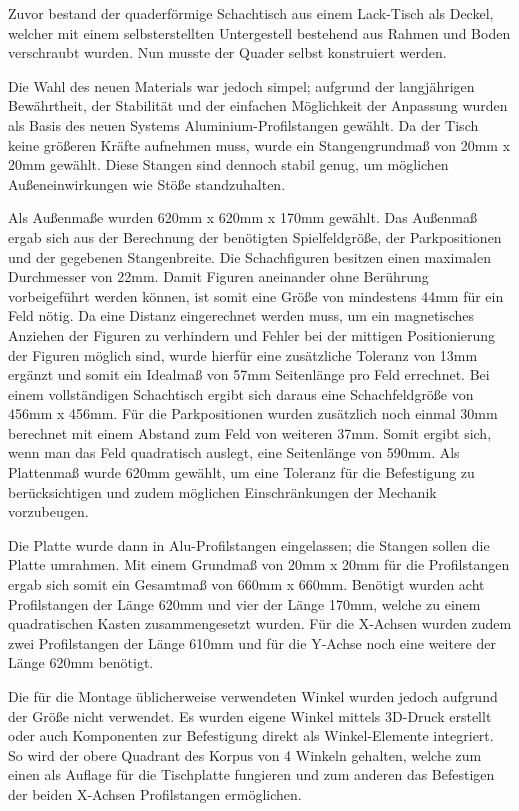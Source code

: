 Zuvor bestand der quaderförmige Schachtisch aus einem Lack-Tisch als
Deckel, welcher mit einem selbsterstellten Untergestell bestehend aus
Rahmen und Boden verschraubt wurden. Nun musste der Quader selbst
konstruiert werden.

Die Wahl des neuen Materials war jedoch simpel; aufgrund der
langjährigen Bewährtheit, der Stabilität und der einfachen Möglichkeit
der Anpassung wurden als Basis des neuen Systems Aluminium-Profilstangen
gewählt. Da der Tisch keine größeren Kräfte aufnehmen muss, wurde ein
Stangengrundmaß von 20mm x 20mm gewählt. Diese Stangen sind dennoch
stabil genug, um möglichen Außeneinwirkungen wie Stöße standzuhalten.

Als Außenmaße wurden 620mm x 620mm x 170mm gewählt. Das Außenmaß ergab
sich aus der Berechnung der benötigten Spielfeldgröße, der
Parkpositionen und der gegebenen Stangenbreite. Die Schachfiguren
besitzen einen maximalen Durchmesser von 22mm. Damit Figuren aneinander
ohne Berührung vorbeigeführt werden können, ist somit eine Größe von
mindestens 44mm für ein Feld nötig. Da eine Distanz eingerechnet werden
muss, um ein magnetisches Anziehen der Figuren zu verhindern und Fehler
bei der mittigen Positionierung der Figuren möglich sind, wurde hierfür
eine zusätzliche Toleranz von 13mm ergänzt und somit ein Idealmaß von
57mm Seitenlänge pro Feld errechnet. Bei einem vollständigen Schachtisch
ergibt sich daraus eine Schachfeldgröße von 456mm x 456mm. Für die
Parkpositionen wurden zusätzlich noch einmal 30mm berechnet mit einem
Abstand zum Feld von weiteren 37mm. Somit ergibt sich, wenn man das Feld
quadratisch auslegt, eine Seitenlänge von 590mm. Als Plattenmaß wurde
620mm gewählt, um eine Toleranz für die Befestigung zu berücksichtigen
und zudem möglichen Einschränkungen der Mechanik vorzubeugen.

Die Platte wurde dann in Alu-Profilstangen eingelassen; die Stangen
sollen die Platte umrahmen. Mit einem Grundmaß von 20mm x 20mm für die
Profilstangen ergab sich somit ein Gesamtmaß von 660mm x 660mm. Benötigt
wurden acht Profilstangen der Länge 620mm und vier der Länge 170mm,
welche zu einem quadratischen Kasten zusammengesetzt wurden. Für die
X-Achsen wurden zudem zwei Profilstangen der Länge 610mm und für die
Y-Achse noch eine weitere der Länge 620mm benötigt.

Die für die Montage üblicherweise verwendeten Winkel wurden jedoch
aufgrund der Größe nicht verwendet. Es wurden eigene Winkel mittels
3D-Druck erstellt oder auch Komponenten zur Befestigung direkt als
Winkel-Elemente integriert. So wird der obere Quadrant des Korpus von 4
Winkeln gehalten, welche zum einen als Auflage für die Tischplatte
fungieren und zum anderen das Befestigen der beiden X-Achsen
Profilstangen ermöglichen.

